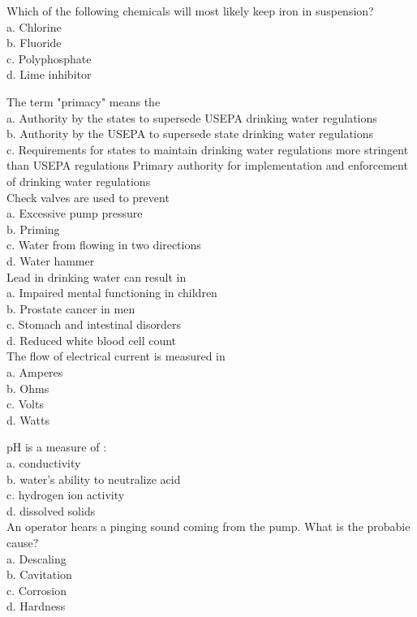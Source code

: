 Which of the following chemicals will most likely keep iron in suspension?\\
a. Chlorine\\
b. Fluoride\\
c. Polyphosphate\\
d. Lime inhibitor 

The term "primacy" means the\\
a. Authority by the states to supersede USEPA drinking water regulations\\
b. Authority by the USEPA to supersede state drinking water regulations\\
c. Requirements for states to maintain drinking water regulations more stringent than USEPA regulations Primary authority for implementation and enforcement of drinking water regulations\\

Check valves are used to prevent\\
a. Excessive pump pressure\\
b. Priming\\
c. Water from flowing in two directions\\
d. Water hammer\\

Lead in drinking water can result in\\
a. Impaired mental functioning in children\\
b. Prostate cancer in men\\
c. Stomach and intestinal disorders\\
d. Reduced white blood cell count\\

The flow of electrical current is measured in\\
a. Amperes\\
b. Ohms\\
c. Volts\\
d. Watts 

$\mathrm{pH}$ is a measure of :\\
a. conductivity\\
b. water's ability to neutralize acid\\
c.  hydrogen ion activity\\
d. dissolved solids\\

An operator hears a pinging sound coming from the pump. What is the probabie cause?\\
a. Descaling\\
b. Cavitation\\
c. Corrosion\\
d. Hardness\\


